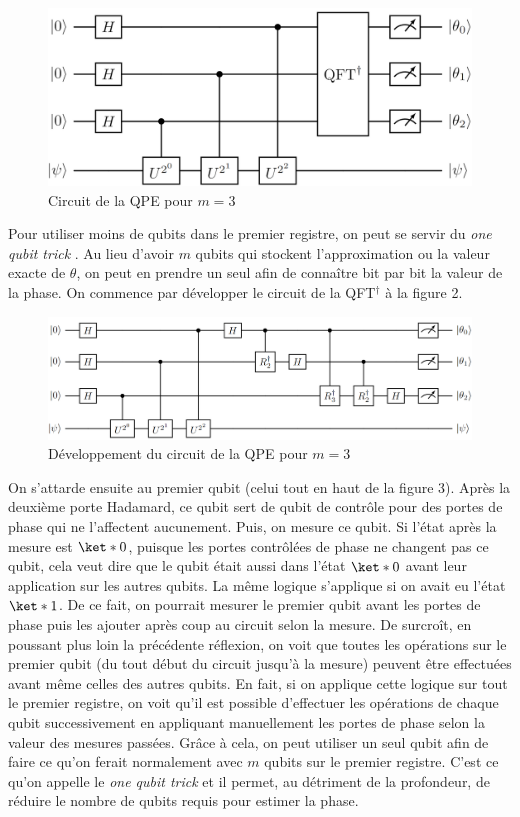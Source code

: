 \begin{figure}[H]
    \centering
    \includegraphics[scale=0.3]{images/circuit_qpe.png}
    \caption{Circuit de la QPE pour $m=3$}
\end{figure}

Pour utiliser moins de qubits dans le premier registre, on peut se servir du \textit{one qubit trick} \cite{Parker_2000}. Au lieu d'avoir $m$ qubits qui stockent l'approximation ou la valeur exacte de $\theta$, on peut en prendre un seul afin de connaître bit par bit la valeur de la phase. On commence par développer le circuit de la QFT$^\dag$ à la figure 2. 

\begin{figure}[H]
    \centering
    \includegraphics[scale=0.37]{images/qpe_etendue.png}
    \caption{Développement du circuit de la QPE pour $m = 3$}
\end{figure}

On s'attarde ensuite au premier qubit (celui tout en haut de la figure 3). Après la deuxième porte Hadamard, ce qubit sert de qubit de contrôle pour des portes de phase qui ne l'affectent aucunement. Puis, on mesure ce qubit. Si l'état après la mesure est $\ket*{0}$, puisque les portes contrôlées de phase ne changent pas ce qubit, cela veut dire que le qubit était aussi dans l'état $\ket*{0}$ avant leur application sur les autres qubits. La même logique s'applique si on avait eu l'état $\ket*{1}$.  De ce fait, on pourrait mesurer le premier qubit avant les portes de phase puis les ajouter après coup au circuit selon la mesure. De surcroît, en poussant plus loin la précédente réflexion, on voit que toutes les opérations sur le premier qubit (du tout début du circuit jusqu'à la mesure) peuvent être effectuées avant même celles des autres qubits. En fait, si on applique cette logique sur tout le premier registre, on voit qu'il est possible d'effectuer les opérations de chaque qubit successivement en appliquant manuellement les portes de phase selon la valeur des mesures passées. Grâce à cela, on peut utiliser un seul qubit afin de faire ce qu'on ferait normalement avec $m$ qubits sur  le premier registre. C'est ce qu'on appelle le \textit{one qubit trick} et il permet, au détriment de la profondeur, de réduire le nombre de qubits requis pour estimer la phase. 

